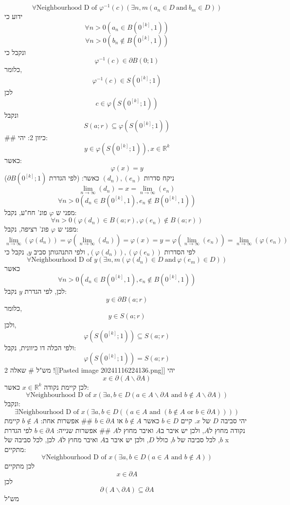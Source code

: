 $$\forall \text{Neighbourhood D of }\varphi^{-1}(c)(\exists n,m(a_{n} \in D\ \text{and}\ b_{m} \in D)) $$
ידוע כי
$$\forall n>0(a_{n} \in B(0^{[k]},1))$$
$$\forall n>0(b_{n} \notin B(0^{[k]},1))$$
ונקבל כי 
$$\varphi^{-1}(c) \in \partial B(0;1)$$
כלומר, 
$$\varphi^{-1}(c) \in S(0^{[k]};1)$$
לכן
$$c \in \varphi(S(0^{[k]};1))$$
ונקבל 
$$S(a;r) \subseteq \varphi(S(0^{[k]};1)) $$
## כיוון 2:
יהי:
$$y \in \varphi(S(0^{[k]};1)),x \in \mathbb{R}^{k}$$
כאשר:
$$\varphi(x) = y$$
ניקח סדרות $(d_{n}),(e_{n})$  כאשר: (לפי הגדרת $\partial B(0^{[k]};1)$)
$$ \lim_{ n \to \infty } {(d_{n})} = x = \lim_{ n \to \infty } {(e_{n})} $$
$$ \forall n>0 (d_{n} \in B(0^{[k]},1),e_{n} \notin B(0^{[k]},1)) $$
מפני ש $\varphi$ פונ' חח"ע, נקבל:
$$\forall n>0(\varphi(d_n) \in B(a;r),\varphi(e_n) \notin B(a;r))$$
מפני ש $\varphi$ פונ' רציפה, נקבל:
$$\lim_{n \rightarrow \infty}(\varphi(d_n)) = \varphi(\lim_{n \rightarrow \infty}(d_n)) = \varphi(x) = y =\varphi(\lim_{n \rightarrow \infty}(e_n))= \lim_{n \rightarrow \infty}(\varphi(e_n))$$
לפי הסדרות $(\varphi(d_n)),(\varphi(e_n))$, ולפי התנהגותן סביב $y$, נקבל כי 
$$\forall \text{Neighbourhood D of }y(\exists n,m(\varphi(d_n) \in D\ \text{and}\ \varphi(e_{m}) \in D)) $$
כאשר
$$ \forall n>0 (d_{n} \in B(0^{[k]},1),e_{n} \notin B(0^{[k]},1)) $$
לכן, לפי הגדרת $y$ נקבל:
$$y \in \partial B(a;r)$$
כלומר,
$$y \in S(a;r)$$
ולכן,
$$\varphi(S(0^{[k]};1)) \subseteq S(a;r)  $$
ולפי הכלה דו כיוונית, נקבל:
$$\varphi(S(0^{[k]};1)) = S(a;r)  $$
מש"ל
# שאלה 2
![[Pasted image 20241116224136.png]]
יהי
$$x \in \partial(A\backslash \partial A)$$
לכן קיימת נקודה $x \in \mathbb{R}^k$ כאשר:
$$\forall \text{Neighbourhood D of }x(\exists a,b \in D(a \in A \backslash \partial A \text{ and } b \notin A \backslash \partial A))$$
ונקבל:
$$\exists \text{Neighbourhood D of }x(\exists a,b \in D((a \in A \text{ and } (b \notin A \text{ or } b \in \partial A))))$$
יהי סביבה $D$ של $x$. קיים $b \in D$ כאשר $b \notin A$ או $b \in \partial A$
## אפשרות אחת: $b \notin A$
קיימת נקודה מחוץ ל$A$, ולכן יש איבר ב$A$ ואיבר מחוץ ל$A$
## אפשרות שנייה: $b \in \partial A$
לפי הגדרת $b$, לכל סביבה של $b$, כולל $D$, ולכן יש איבר ב$A$ ואיבר מחוץ ל$A$
לכן, לכל סביבה של x מתקיים:
$$\forall \text{Neighbourhood D of }x(\exists a,b \in D(a \in A \text{ and } b \notin A))$$
לכן מתקיים
$$ x \in \partial A $$
לכן
$$\partial ( A \backslash \partial A ) \subseteq \partial A $$
מש"ל


